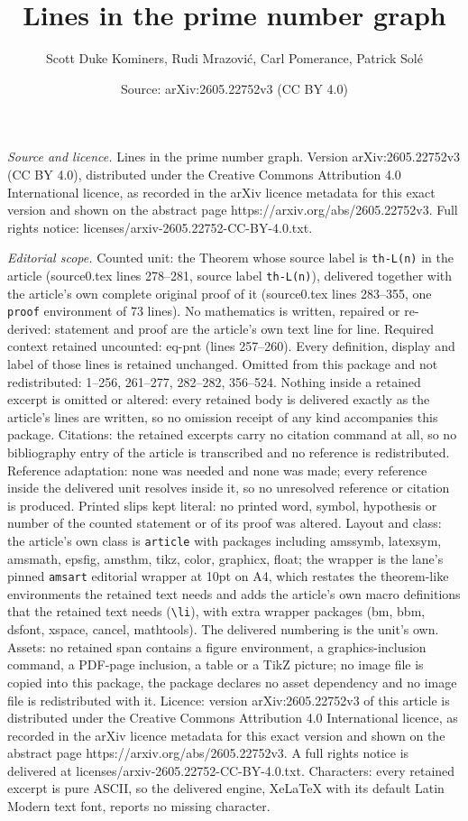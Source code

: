 \documentclass[10pt,a4paper]{amsart}
\title[Lines in the prime number graph]{Lines in the prime number graph}
\author{Scott Duke Kominers, Rudi Mrazovi\'c, Carl Pomerance, Patrick Sol\'e}
\date{Source: arXiv:2605.22752v3 (CC BY 4.0)}
\begin{document}
\maketitle

\noindent\emph{Source and licence.} Lines in the prime number graph. Version arXiv:2605.22752v3 (CC BY 4.0), distributed under the Creative Commons Attribution 4.0 International licence, as recorded in the arXiv licence metadata for this exact version and shown on the abstract page https://arxiv.org/abs/2605.22752v3. Full rights notice: licenses/arxiv-2605.22752-CC-BY-4.0.txt.\par\smallskip

\noindent\textit{Editorial scope.} Counted unit: the Theorem whose source label is \texttt{th-L(n)} in the article (source0.tex lines 278--281, source label \texttt{th-L(n)}), delivered together with the article's own complete original proof of it (source0.tex lines 283--355, one \texttt{proof} environment of 73 lines). No mathematics is written, repaired or re-derived: statement and proof are the article's own text line for line. Required context retained uncounted: eq-pnt (lines 257--260). Every definition, display and label of those lines is retained unchanged. Omitted from this package and not redistributed: 1--256, 261--277, 282--282, 356--524. Nothing inside a retained excerpt is omitted or altered: every retained body is delivered exactly as the article's lines are written, so no omission receipt of any kind accompanies this package. Citations: the retained excerpts carry no citation command at all, so no bibliography entry of the article is transcribed and no reference is redistributed. Reference adaptation: none was needed and none was made; every reference inside the delivered unit resolves inside it, so no unresolved reference or citation is produced. Printed slips kept literal: no printed word, symbol, hypothesis or number of the counted statement or of its proof was altered. Layout and class: the article's own class is \texttt{article} with packages including amssymb, latexsym, amsmath, epsfig, amsthm, tikz, color, graphicx, float; the wrapper is the lane's pinned \texttt{amsart} editorial wrapper at 10pt on A4, which restates the theorem-like environments the retained text needs and adds the article's own macro definitions that the retained text needs (\texttt{\textbackslash li}), with extra wrapper packages (bm, bbm, dsfont, xspace, cancel, mathtools). The delivered numbering is the unit's own. Assets: no retained span contains a figure environment, a graphics-inclusion command, a PDF-page inclusion, a table or a TikZ picture; no image file is copied into this package, the package declares no asset dependency and no image file is redistributed with it. Licence: version arXiv:2605.22752v3 of this article is distributed under the Creative Commons Attribution 4.0 International licence, as recorded in the arXiv licence metadata for this exact version and shown on the abstract page https://arxiv.org/abs/2605.22752v3. A full rights notice is delivered at licenses/arxiv-2605.22752-CC-BY-4.0.txt. Characters: every retained excerpt is pure ASCII, so the delivered engine, XeLaTeX with its default Latin Modern text font, reports no missing character.
\end{document}
